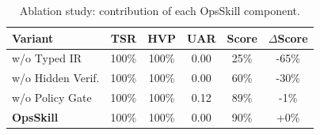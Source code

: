 \begin{table}[t]
\centering
\caption{Ablation study: contribution of each OpsSkill component.}
\label{tab:ablation}
\small
\begin{tabular}{lccccc}
\toprule
\textbf{Variant} & \textbf{TSR} & \textbf{HVP} & \textbf{UAR} & \textbf{Score} & $\Delta$\textbf{Score} \\
\midrule
w/o Typed IR & 100\% & 100\% & 0.00 & 25\% & -65\% \\
w/o Hidden Verif. & 100\% & 100\% & 0.00 & 60\% & -30\% \\
w/o Policy Gate & 100\% & 100\% & 0.12 & 89\% & -1\% \\
\textbf{OpsSkill} & 100\% & 100\% & 0.00 & 90\% & +0\% \\
\bottomrule
\end{tabular}
\end{table}
